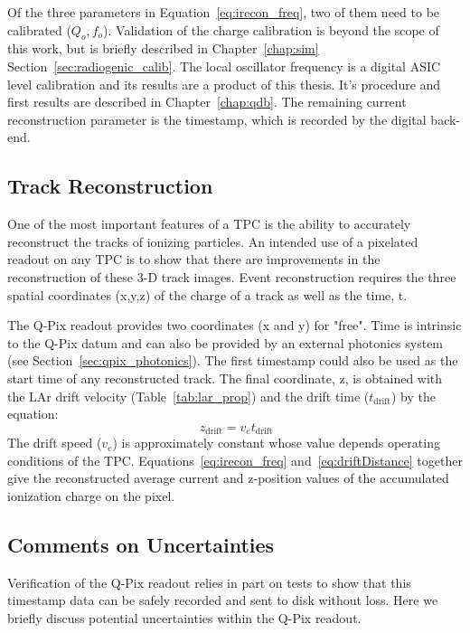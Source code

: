 Of the three parameters in Equation~\ref{eq:irecon_freq}, two of them need to be calibrated ($Q_{o}, f_{o}$).
Validation of the charge calibration is beyond the scope of this work, but is briefly described in Chapter~\ref{chap:sim} Section~\ref{sec:radiogenic_calib}.
The local oscillator frequency is a digital ASIC level calibration and its results are a product of this thesis.
It's procedure and first results are described in Chapter~\ref{chap:qdb}.
The remaining current reconstruction parameter is the timestamp, which is recorded by the digital back-end.

\subsection{Track Reconstruction}
One of the most important features of a TPC is the ability to accurately reconstruct the tracks of ionizing particles.
An intended use of a pixelated readout on any TPC is to show that there are improvements in the reconstruction of these 3-D track images.
Event reconstruction requires the three spatial coordinates (x,y,z) of the charge of a track as well as the time, t. 

The Q-Pix readout provides two coordinates (x and y) for "free".
Time is intrinsic to the Q-Pix datum and can also be provided by an external photonics system (see Section~\ref{sec:qpix_photonics}).
The first timestamp could also be used as the start time of any reconstructed track.
The final coordinate, z, is obtained with the LAr drift velocity (Table~\ref{tab:lar_prop}) and the drift time ($t_{\mathrm{drift}}$) by the equation:
\begin{equation}~\label{eq:driftDistance}
  z_{\mathrm{drift}} = v_{e}t_{\mathrm{drift}}
\end{equation}
The drift speed ($v_{e}$) is approximately constant whose value depends operating conditions of the TPC.
Equations~\ref{eq:irecon_freq} and~\ref{eq:driftDistance} together give the reconstructed average current and z-position values of the accumulated ionization charge on the pixel.

\subsection{Comments on Uncertainties}
Verification of the Q-Pix readout relies in part on tests to show that this timestamp data can be safely recorded and sent to disk without loss.
Here we briefly discuss potential uncertainties within the Q-Pix readout.

